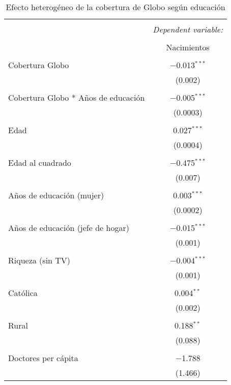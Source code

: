 
\begin{table}[!htbp] \centering 
  \caption{Efecto heterogéneo de la cobertura de Globo según educación} 
  \label{tab:heterogeneidad_globo} 
\begin{tabular}{@{\extracolsep{5pt}}lc} 
\\[-1.8ex]\hline 
\hline \\[-1.8ex] 
 & \multicolumn{1}{c}{\textit{Dependent variable:}} \\ 
\cline{2-2} 
\\[-1.8ex] & Nacimientos \\ 
\hline \\[-1.8ex] 
 Cobertura Globo & $-$0.013$^{***}$ \\ 
  & (0.002) \\ 
  & \\ 
 Cobertura Globo * Años de educación & $-$0.005$^{***}$ \\ 
  & (0.0003) \\ 
  & \\ 
 Edad & 0.027$^{***}$ \\ 
  & (0.0004) \\ 
  & \\ 
 Edad al cuadrado & $-$0.475$^{***}$ \\ 
  & (0.007) \\ 
  & \\ 
 Años de educación (mujer) & 0.003$^{***}$ \\ 
  & (0.0002) \\ 
  & \\ 
 Años de educación (jefe de hogar) & $-$0.015$^{***}$ \\ 
  & (0.001) \\ 
  & \\ 
 Riqueza (sin TV) & $-$0.004$^{***}$ \\ 
  & (0.001) \\ 
  & \\ 
 Católica & 0.004$^{**}$ \\ 
  & (0.002) \\ 
  & \\ 
 Rural & 0.188$^{**}$ \\ 
  & (0.088) \\ 
  & \\ 
 Doctores per cápita & $-$1.788 \\ 
  & (1.466) \\ 

\end{tabular}
\end{table}
